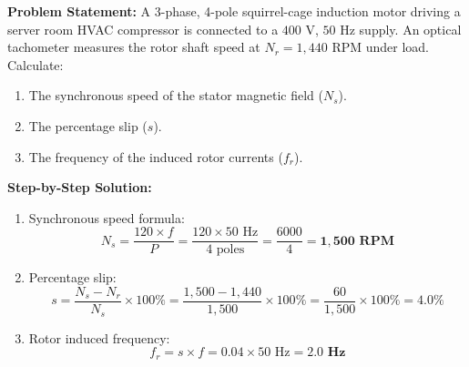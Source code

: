\begin{tcolorbox}[colback=white,colframe=navyblue,title=\textbf{Problem 7: 3-Phase AC Induction Motor Speed and Slip}]
\textbf{Problem Statement:} A 3-phase, 4-pole squirrel-cage induction motor driving a server room HVAC compressor is connected to a $400\text{ V}$, $50\text{ Hz}$ supply. An optical tachometer measures the rotor shaft speed at $N_r = 1,440\text{ RPM}$ under load. Calculate:
\begin{enumerate}[label=(\alph*),leftmargin=*]
    \item The synchronous speed of the stator magnetic field ($N_s$).
    \item The percentage slip ($s$).
    \item The frequency of the induced rotor currents ($f_r$).
\end{enumerate}
\textbf{Step-by-Step Solution:}
\begin{enumerate}[label=(\alph*),leftmargin=*]
    \item Synchronous speed formula:
    \[
    N_s = \frac{120 \times f}{P} = \frac{120 \times 50\text{ Hz}}{4\text{ poles}} = \frac{6000}{4} = \mathbf{1,500\text{ RPM}}
    \]
    \item Percentage slip:
    \[
    s = \frac{N_s - N_r}{N_s} \times 100\% = \frac{1,500 - 1,440}{1,500} \times 100\% = \frac{60}{1,500} \times 100\% = \mathbf{4.0\%}
    \]
    \item Rotor induced frequency:
    \[
    f_r = s \times f = 0.04 \times 50\text{ Hz} = \mathbf{2.0\text{ Hz}}
    \]
\end{enumerate}
\end{tcolorbox}

